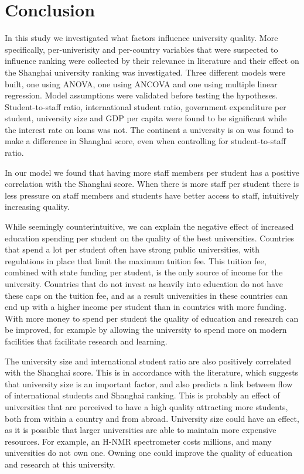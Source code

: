\documentclass{stats_apa_style2}
\begin{document}
\section*{Conclusion}
\label{Conclusion}
In this study we investigated what factors influence university quality.
More specifically, per-univerisity and per-country variables that were suspected
to influence ranking were collected by their relevance in literature and their
effect on the Shanghai university ranking was investigated. Three different models were built, one using ANOVA,
one using ANCOVA and one using multiple linear regression. Model assumptions
were validated before testing the hypotheses. Student-to-staff ratio,
international student ratio, government expenditure per student, university size
and GDP per capita were found to be significant while the interest rate on loans
was not. The continent a university is on was found to make a difference in
Shanghai score, even when controlling for student-to-staff ratio.

In our model we found that having more staff members per student has a positive
correlation with the Shanghai score. When there is more staff per student there is less
pressure on staff members and students have better access to staff, intuitively
increasing quality. 

While seemingly counterintuitive, we can explain the negative effect of
increased education spending per student on the quality of the best
universities. Countries that spend a lot per student often have strong public
universities, with regulations in place that limit the maximum tuition fee. This
tuition fee, combined with state funding per student, is the only source of
income for the university. Countries that do not invest as heavily into
education do not have these caps on the tuition fee, and as a result
universities in these countries can end up with a higher income per student than
in countries with more funding. With more money to spend per student the quality
of education and research can be improved, for example by allowing the
university to spend more on modern facilities that facilitate research and
learning.

The university size and international student ratio are also positively
correlated with the Shanghai score. This is in accordance with the literature,
which suggests that university size is an important factor, and also predicts a
link between flow of international students and Shanghai ranking. This is
probably an effect of universities that are perceived to have a high quality attracting more students, both from within a country and from abroad. University size could have an effect, as it is possible that larger universities are able to maintain more expensive resources.
For example, an H-NMR spectrometer costs millions, and many universities do
not own one. Owning one could improve the quality of education and research at this
university.
\end{document}
